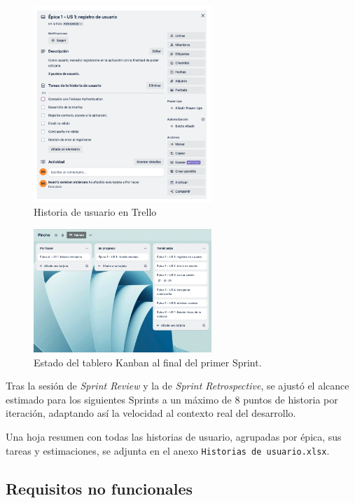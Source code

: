 \begin{figure}[H]
\centering
\includegraphics[width=0.6\textwidth]{./img/requirements/user_story_trello.png}
\caption{Historia de usuario en Trello}
\label{fig:user_story_trello}
\end{figure}

\begin{figure}[H]
\centering
\includegraphics[width=0.6\textwidth]{./img/requirements/final_sprint_trello.png}
\caption{Estado del tablero Kanban al final del primer Sprint.}
\label{fig:final_sprint_trello}
\end{figure}

Tras la sesión de \textit{Sprint Review} y la de \textit{Sprint Retrospective}, se ajust\'o el alcance estimado para los siguientes Sprints a un m\'aximo de 8 puntos de historia por iteraci\'on, adaptando as\'i la velocidad al contexto real del desarrollo.

Una hoja resumen con todas las historias de usuario, agrupadas por \'epica, sus tareas y estimaciones, se adjunta en el anexo \texttt{Historias de usuario.xlsx}.

\subsection{Requisitos no funcionales}

